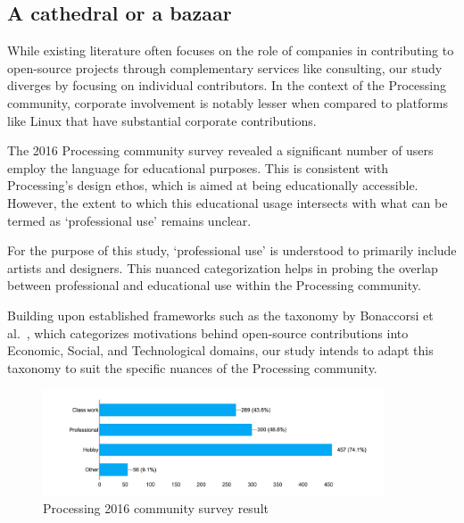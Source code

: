 \subsection{A cathedral or a bazaar}

While existing literature often focuses on the role of companies in contributing to open-source projects through complementary services like consulting, our study diverges by focusing on individual contributors. In the context of the Processing community, corporate involvement is notably lesser when compared to platforms like Linux that have substantial corporate contributions.

The 2016 Processing community survey revealed a significant number of users employ the language for educational purposes. This is consistent with Processing's design ethos, which is aimed at being educationally accessible. However, the extent to which this educational usage intersects with what can be termed as `professional use' remains unclear.

For the purpose of this study, `professional use' is understood to primarily include artists and designers. This nuanced categorization helps in probing the overlap between professional and educational use within the Processing community.

Building upon established frameworks such as the taxonomy by Bonaccorsi et al.~\cite{bonaccorsiComparingMotivationsIndividual2006}, which categorizes motivations behind open-source contributions into Economic, Social, and Technological domains, our study intends to adapt this taxonomy to suit the specific nuances of the Processing community.

\begin{figure}[h!]
	\centering
	\includegraphics[width=0.9\textwidth]{images/community-survey.png}
	\caption{Processing 2016 community survey result \parencite{2016CommunitySurvey}}
	\label{fig:community_survey}
\end{figure}




